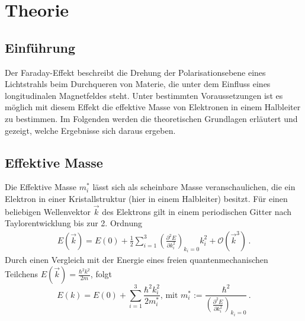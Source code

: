 \section{Theorie}
\label{sec:Theorie}

\subsection{Einführung}
Der Faraday-Effekt beschreibt die Drehung der Polarisationsebene eines Lichtstrahls beim Durchqueren von Materie, die unter dem Einfluss eines longitudinalen Magnetfeldes steht.
Unter bestimmten Voraussetzungen ist es möglich mit diesem Effekt die effektive Masse von Elektronen in einem Halbleiter zu bestimmen.
Im Folgenden werden die theoretischen Grundlagen erläutert und gezeigt, welche Ergebnisse sich daraus ergeben.
\subsection{Effektive Masse}
Die Effektive Masse $m_i^*$ lässt sich als scheinbare Masse veranschaulichen, die ein Elektron in einer Kristallstruktur (hier in einem Halbleiter) besitzt. Für einen beliebigen Wellenvektor $\vec{k}$ des Elektrons gilt in einem periodischen Gitter nach Taylorentwicklung bis zur 2. Ordnung
\begin{align*}
	E(\vec{k})=E(0)+\frac{1}{2}\sum_{i=1}^3\left(\frac{\partial^2 E}{\partial k_i^2}\right)_{k_i=0}k_i^2+\mathcal{O}(\vec{k}^3) \, \mathrm{.}
\end{align*}
Durch einen Vergleich mit der Energie eines freien quantenmechanischen Teilchens $E(\vec{k})=\frac{\hbar^2k^2}{2m}$, folgt
\begin{equation}
	E(k)=E(0)+\sum_{i=1}^3\frac{\hbar^2k_i^2}{2m_i^*}\text{, mit }m_i^*:=\frac{\hbar^2}{\left(\frac{\partial^2 E}{\partial k_i^2}\right)_{k_i=0}} \, \mathrm{.}
\end{equation}
